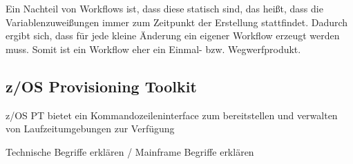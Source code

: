 Ein Nachteil von Workflows ist, dass diese statisch sind, das heißt, dass die Variablenzuweißungen immer zum Zeitpunkt der Erstellung stattfindet.
Dadurch ergibt sich, dass für jede kleine Änderung ein eigener Workflow erzeugt werden muss.
Somit ist ein Workflow eher ein Einmal- bzw. Wegwerfprodukt.



\subsection{z/OS Provisioning Toolkit}
z/OS PT bietet ein Kommandozeileninterface zum bereitstellen und verwalten von Laufzeitumgebungen zur Verfügung
\cite{IBM.2019}

Technische Begriffe erklären / Mainframe Begriffe erklären

